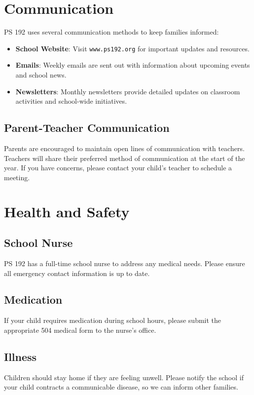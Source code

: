 \documentclass[11pt]{article}
\begin{document}
\section{Communication}
\label{sec:org64baec1}
PS 192 uses several communication methods to keep families informed:
\begin{itemize}
\item \textbf{\textbf{School Website}}: Visit \texttt{www.ps192.org} for important updates and resources.
\item \textbf{\textbf{Emails}}: Weekly emails are sent out with information about upcoming events and school news.
\item \textbf{\textbf{Newsletters}}: Monthly newsletters provide detailed updates on classroom activities and school-wide initiatives.
\end{itemize}

\subsection{Parent-Teacher Communication}
\label{sec:org1e8a126}
Parents are encouraged to maintain open lines of communication with teachers. Teachers will share their preferred method of communication at the start of the year. If you have concerns, please contact your child’s teacher to schedule a meeting.

\section{Health and Safety}
\label{sec:org1cb1394}
\subsection{School Nurse}
\label{sec:org128b1e0}
PS 192 has a full-time school nurse to address any medical needs. Please ensure all emergency contact information is up to date.

\subsection{Medication}
\label{sec:orgc602d48}
If your child requires medication during school hours, please submit the appropriate 504 medical form to the nurse’s office.

\subsection{Illness}
\label{sec:org7ff59e2}
Children should stay home if they are feeling unwell. Please notify the school if your child contracts a communicable disease, so we can inform other families.
\end{document}
